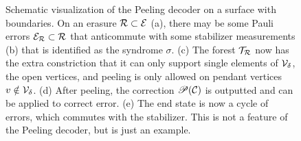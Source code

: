\begin{figure}
    \vspace{2em}
    \caption{Schematic visualization of the Peeling decoder on a surface with boundaries. On an erasure $\mathcal{R}\subset \mathcal{E}$ (a), there may be some Pauli errors $\mathcal{E}_{\mathcal{R}} \subset \mathcal{R}$ that anticommute with some stabilizer measurements (b) that is identified as the syndrome $\sigma$. (c) The forest $\mathcal{T}_{\mathcal{R}}$ now has the extra constriction that it can only support single elements of $\mathcal{V}_\delta$, the open vertices, and peeling is only allowed on pendant vertices $v\notin \mathcal{V}_\delta$. (d) After peeling, the correction $\mathscr{P}(\mathcal{C})$ is outputted and can be applied to correct error. (e) The end state is now a cycle of errors, which commutes with the stabilizer. This is not a feature of the Peeling decoder, but is just an example.}
  \end{figure}
